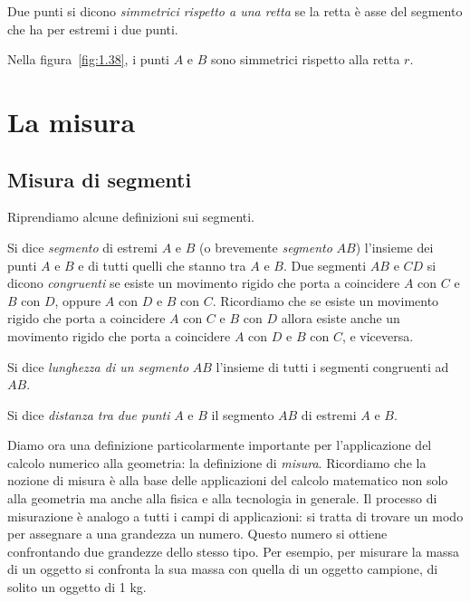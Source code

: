 \begin{definizione}
Due punti si dicono \emph{simmetrici rispetto a una retta} se la retta è asse del segmento che ha per estremi i due punti.
\end{definizione}

Nella figura~\ref{fig:1.38}, i punti $A$ e $B$ sono simmetrici rispetto alla retta $r$.

\vspazio\ovalbox{\risolvii \ref{ese:1.66}, \ref{ese:1.67}, \ref{ese:1.68}, \ref{ese:1.69}, \ref{ese:1.70}, \ref{ese:1.71}, \ref{ese:1.72}, \ref{ese:1.73}, \ref{ese:1.74}, \ref{ese:1.75}, \ref{ese:1.76}, \ref{ese:1.77}, \ref{ese:1.78},}

\ovalbox{\ref{ese:1.79}, \ref{ese:1.80}, \ref{ese:1.81}, \ref{ese:1.82}, \ref{ese:1.83}, \ref{ese:1.84}, \ref{ese:1.85}, \ref{ese:1.86}, \ref{ese:1.87}, \ref{ese:1.88}, \ref{ese:1.89}, \ref{ese:1.90}, \ref{ese:1.91}, \ref{ese:1.92},\ref{ese:1.93}, \ref{ese:1.94}, \ref{ese:1.95},}

\ovalbox{\ref{ese:1.96}, \ref{ese:1.97}, \ref{ese:1.98}, \ref{ese:1.99}, \ref{ese:1.100}, \ref{ese:1.101}, \ref{ese:1.102}, \ref{ese:1.103}}


\section{La misura}

\subsection{Misura di segmenti}

Riprendiamo alcune definizioni sui segmenti.

Si dice \emph{segmento} di estremi $A$ e $B$ (o brevemente \emph{segmento} $AB$) l'insieme dei punti $A$ e $B$ e di tutti quelli che stanno tra $A$ e $B$.
Due segmenti $AB$ e $CD$ si dicono \emph{congruenti} se esiste un movimento rigido che porta a coincidere $A$ con $C$ e $B$ con $D$, oppure $A$ con $D$ e $B$ con $C$. Ricordiamo che se esiste un movimento rigido che porta a coincidere $A$ con $C$ e $B$ con $D$ allora esiste anche un movimento rigido che porta a coincidere $A$ con $D$ e $B$ con $C$, e viceversa.

Si dice \emph{lunghezza di un segmento} $AB$ l'insieme di tutti i segmenti congruenti ad $AB$.

Si dice \emph{distanza tra due punti} $A$ e $B$ il segmento $AB$ di estremi $A$ e $B$.

Diamo ora una definizione particolarmente importante per l'applicazione del calcolo numerico alla geometria: la definizione di \emph{misura}. Ricordiamo che la nozione di misura è alla base delle applicazioni del calcolo matematico non solo alla geometria ma anche alla fisica e alla tecnologia in generale. Il processo di misurazione è analogo a tutti i campi di applicazioni: si tratta di trovare un modo per assegnare a una grandezza un numero. Questo numero si ottiene confrontando due grandezze dello stesso tipo. Per esempio, per misurare la massa di un oggetto si confronta la sua massa con quella di un oggetto campione, di solito un oggetto di 1 kg.

